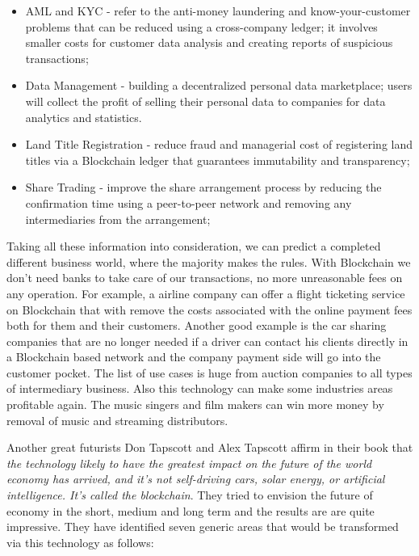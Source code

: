\begin{itemize}
	\item AML and KYC - refer to the anti-money laundering and know-your-customer problems that can be reduced using a cross-company ledger; it involves smaller costs for customer data analysis and creating reports of suspicious transactions;
	\item Data Management - building a decentralized personal data marketplace; users will collect the profit of selling their personal data to companies for data analytics and statistics.
	\item Land Title Registration - reduce fraud and managerial cost of registering land titles via a Blockchain ledger that guarantees immutability and transparency;
	\item Share Trading - improve the share arrangement process by reducing the confirmation time using a peer-to-peer network and removing any intermediaries from the arrangement;
\end{itemize}

Taking all these information into consideration, we can predict a completed different business world, where the majority makes the rules. With Blockchain we don't need banks to take care of our transactions, no more unreasonable fees on any operation. For example, a airline company can offer a flight ticketing service on Blockchain that with remove the costs associated with the online payment fees both for them and their customers. Another good example is the car sharing companies that are no longer needed if a driver can contact his clients directly in a Blockchain based network and the company payment side will go into the customer pocket. The list of use cases is huge from auction companies to all types of intermediary business. Also this technology can make some industries areas profitable again. The music singers and film makers can win more money by removal of music and streaming distributors.

Another great futurists Don Tapscott and Alex Tapscott \cite{tapscott} affirm in their book that \emph{the technology likely to have the greatest impact on the future of the world economy has arrived, and it’s not self-driving cars, solar energy, or artificial intelligence. It’s called the blockchain}. They tried to envision the future of economy in the short, medium and long term and the results are are quite impressive. They have identified seven generic areas that would be transformed via this technology as follows:

